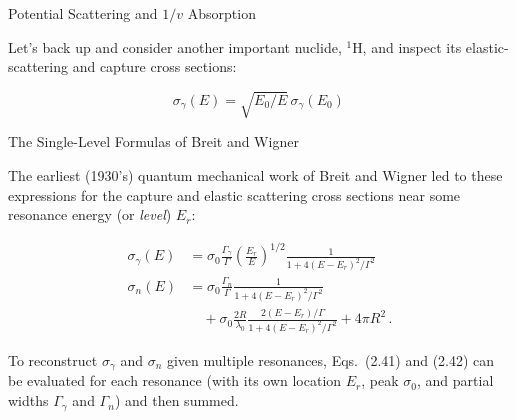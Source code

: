 \documentclass[aspectratio=1610]{beamer}
\begin{document}
\begin{frame}[fragile]{Potential Scattering and $1/v$ Absorption}

Let's back up and consider another important nuclide, ${}^{1}$H, and inspect its elastic-scattering and capture cross sections:
\begin{figure}[h]
    \centering
    \resizebox{1\textwidth}{!}{}
\end{figure}
 
\begin{equation*}
 \sigma_{\gamma}(E) = \sqrt{E_0/E} \,\sigma_{\gamma}(E_0) \, 
\tag{FNRP 2.36}
\end{equation*}

  
\end{frame}


\begin{frame}{The Single-Level Formulas of Breit and Wigner}
 
The earliest (1930's) quantum mechanical work of Breit and Wigner led to these expressions for the capture and elastic scattering cross sections near some resonance energy (or {\it level}) $E_r$:

\begin{align*}
\tag{FNRP 2.41}
\sigma_{\gamma}(E) &= \sigma_0 \frac{\Gamma_{\gamma}}{\Gamma} \left (\frac{E_r}{E} \right)^{1/2} \frac{1}{1+ 4(E-E_r)^2/\Gamma^2} \\
%
\tag{FNRP 2.42}
\sigma_{n}(E) &= \sigma_0 \frac{\Gamma_{n}}{\Gamma}  \frac{1}{1+ 4(E-E_r)^2/\Gamma^2}\\
              & \quad + \sigma_0 \frac{2R}{\lambda_0} \frac{ 2(E-E_r)/\Gamma }{1 + 4 (E-E_r)^2/\Gamma^2} 
              + 4\pi R^2 \, .
\end{align*}
 
To reconstruct $\sigma_{\gamma}$ and $\sigma_{n}$ given multiple resonances, Eqs.~(2.41) and (2.42) can be evaluated for each resonance (with its own location $E_r$, peak $\sigma_0$, and partial widths $\Gamma_{\gamma}$ and $\Gamma_{n}$) and then summed.

\end{frame}
\end{document}
